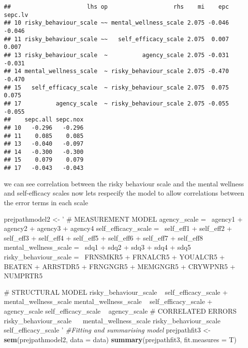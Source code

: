 \documentclass[9pt,]{article}
\newenvironment{Shaded}{\begin{snugshade}}{\end{snugshade}}
\newcommand{\KeywordTok}[1]{\textcolor[rgb]{0.13,0.29,0.53}{\textbf{#1}}}
\newcommand{\DataTypeTok}[1]{\textcolor[rgb]{0.13,0.29,0.53}{#1}}
\newcommand{\StringTok}[1]{\textcolor[rgb]{0.31,0.60,0.02}{#1}}
\newcommand{\CommentTok}[1]{\textcolor[rgb]{0.56,0.35,0.01}{\textit{#1}}}
\newcommand{\NormalTok}[1]{#1}
\begin{document}
\begin{verbatim}
##                      lhs op                   rhs    mi    epc sepc.lv
## 10 risky_behaviour_scale ~~ mental_wellness_scale 2.075 -0.046  -0.046
## 11 risky_behaviour_scale ~~   self_efficacy_scale 2.075  0.007   0.007
## 13 risky_behaviour_scale  ~          agency_scale 2.075 -0.031  -0.031
## 14 mental_wellness_scale  ~ risky_behaviour_scale 2.075 -0.470  -0.470
## 15   self_efficacy_scale  ~ risky_behaviour_scale 2.075  0.075   0.075
## 17          agency_scale  ~ risky_behaviour_scale 2.075 -0.055  -0.055
##    sepc.all sepc.nox
## 10   -0.296   -0.296
## 11    0.085    0.085
## 13   -0.040   -0.097
## 14   -0.300   -0.300
## 15    0.079    0.079
## 17   -0.043   -0.043
\end{verbatim}

we can see correlation between the risky behaviour scale and the mental
wellness and self-efficacy scales now lets respecify the model to allow
correlations between the error terms in each scale

\begin{Shaded}
\begin{Highlighting}[]
\NormalTok{  prejpathmodel2 <-}\StringTok{ '}
\StringTok{                # MEASUREMENT MODEL}
\StringTok{                  agency_scale =~ agency1 + agency2 + agency3 + agency4}
\StringTok{                  self_efficacy_scale =~ self_eff1 + self_eff2 + self_eff3 + self_eff4 + self_eff5 + self_eff6                   + self_eff7 + self_eff8}
\StringTok{                  mental_wellness_scale =~ sdq1 + sdq2 + sdq3 + sdq4 + sdq5}
\StringTok{                  risky_behaviour_scale =~ FRNSMKR5 + FRNALCR5 + YOUALCR5 + BEATEN + ARRSTDR5 + FRNGNGR5 +                      MEMGNGR5 + CRYWPNR5 + NUMPRTR5}

\StringTok{      }
\StringTok{                # STRUCTURAL MODEL}
\StringTok{                  risky_behaviour_scale ~ self_efficacy_scale + mental_wellness_scale}
\StringTok{                  mental_wellness_scale ~ self_efficacy_scale + agency_scale}
\StringTok{                  self_efficacy_scale ~  agency_scale }
\StringTok{                  }
\StringTok{                # CORRELATED ERRORS}
\StringTok{                  risky_behaviour_scale ~~  mental_wellness_scale}
\StringTok{                  risky_behaviour_scale ~~  self_efficacy_scale}
\StringTok{      }
\StringTok{               '}
\CommentTok{#Fitting and summarising model}
\NormalTok{ prejpathfit3 <-}\StringTok{ }\KeywordTok{sem}\NormalTok{(prejpathmodel2, }\DataTypeTok{data =}\NormalTok{ data)}
      \KeywordTok{summary}\NormalTok{(prejpathfit3, }\DataTypeTok{fit.measures =}\NormalTok{ T)}
\end{Highlighting}
\end{Shaded}
\end{document}
